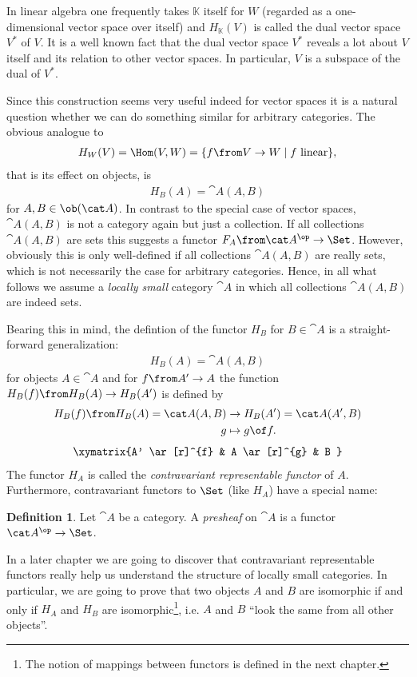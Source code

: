 \documentclass{article}
\theoremstyle{definition}
\newtheorem{definition}{Definition}
\begin{document}
In linear algebra one frequently takes $\mathbb K$ itself for $W$ (regarded as a one-dimensional vector space over itself) and $H_{\mathbb K}(V)$ is called the dual vector space $V^*$ of $V$. It is a well known fact that the dual vector space $V^*$ reveals a lot about $V$ itself and its relation to other vector spaces. In particular, $V$ is a subspace of the dual of $V^*$.

Since this construction seems very useful indeed for vector spaces it is a natural question whether we can do something similar for arbitrary categories.
The obvious analogue to 
\begin{align*}
  H_W(V)=\Hom(V,W)=\{f\from V\to W\mid f \text{ linear}\},
\end{align*}
 that is its effect on objects, is
\begin{align*}
  H_B(A)=\cat A(A,B)
\end{align*}
for $A,B\in\ob(\cat A)$. In contrast to the special case of vector spaces, $\cat A(A,B)$ is not a category again but just a collection. If all collections $\cat A(A,B)$ are sets this suggests a functor $F_A\from\cat A^\op\to\Set$. However, obviously this is only well-defined if all collections $\cat A(A,B)$ are really sets, which is not necessarily the case for arbitrary categories. Hence, in all what follows we assume a \emph{locally small} category $\cat A$ in which all collections $\cat A(A,B)$ are indeed sets. 

Bearing this in mind, the defintion of the functor $H_B$ for $B\in\cat A$ is a straight-forward generalization:
\begin{align*}
  H_B(A)=\cat A(A,B)
\end{align*}
for objects $A\in\cat A$ and for $f\from A'\to A$ the function $H_B(f)\from H_B(A)\to H_B(A')$ is defined by
\begin{align*}
  H_B(f)\from H_B(A)=\cat A(A,B)&\to H_B(A')=\cat A(A',B)\\
  g&\mapsto g\of f.
\end{align*}
\vspace{-0.7cm}
\begin{align*}
  \xymatrix{A' \ar[r]^{f} & A \ar[r]^{g} & B }
\end{align*}
The functor $H_A$ is called the \emph{contravariant representable functor} of $A$. Furthermore, contravariant functors to $\Set$ (like $H_A$) have a special name:
\begin{definition}
  Let $\cat A$ be a category. A \emph{presheaf} on $\cat A$ is a functor $\cat A^\op\to\Set$.
\end{definition}
In a later chapter we are going to discover that contravariant representable functors really help us understand the structure of locally small categories. In particular, we are going to prove that two objects $A$ and $B$ are isomorphic if and only if $H_A$ and $H_B$ are isomorphic\footnote{The notion of mappings between functors is defined in the next chapter.}, i.e. $A$ and $B$ ``look the same from all other objects''.
\end{document}
